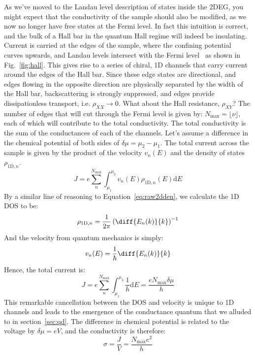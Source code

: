 As we've moved to the Landau level description of states inside the 2DEG, you might expect that the conductivity of the sample should also
be modified, as we now no longer have free states at the Fermi level. In fact this intuition is correct, and the bulk of a Hall bar in the quantum
Hall regime will indeed be insulating. Current is carried at the edges of the sample, where the confining potential curves upwards, and Landau levels
intersect with the Fermi level~\cite{PhysRevB.25.2185} as shown in Fig.~\ref{fig:hall}. This gives rise to a series of chiral, 1D channels that carry current around the edges
of the Hall bar. Since these edge states are directional, and edges flowing in the opposite direction are physically separated by the width of the Hall
bar, backscattering is strongly suppressed, and edges provide dissipationless transport, i.e. $\rho_{XX} \rightarrow 0$. What about
the Hall resistance, $\rho_{XY}$? The number of edges that will cut through the Fermi level is given by: $N_\textrm{max} = \lfloor \nu \rfloor$, each of which
will contribute to the total conductivity. The total conductivity is the sum of the conductances of each of the channels. Let's assume a difference in the
chemical potential of both sides of $\delta \mu = \mu_2 - \mu_1$. The total current across the sample is given by the product of the velocity $v_n(E)$
and the density of states $\rho_{\textrm{1D},n}$.
\begin{equation}
  J = e\sum_n^{N_{\textrm{max}}} \int_{\mu_1}^{\mu_2} v_n(E)\rho_{\textrm{1D},n}(E) \mathrm{d}E
\end{equation}
By a similar line of reasoning to Equation~\ref{eq:raw2dden}, we calculate the 1D DOS to be:
\begin{equation}
  \rho_{\textrm{1D},n} = \frac{1}{2\pi}\left(\diff{E_n(k)}{k}\right)^{-1}
\end{equation}
And the velocity from quantum mechanics is simply:
\begin{equation}
  v_n(E) = \frac{1}{\hbar}\diff{E_n(k)}{k}
\end{equation}
Hence, the total current is:
\begin{equation}
  J = e\sum_n^{N_{\textrm{max}}} \int_{\mu_1}^{\mu_2} \frac{1}{h} \mathrm{d}E = \frac{e N_{\textrm{max}} \delta\mu}{h}
\end{equation}
This remarkable cancellation between the DOS and velocity is unique to 1D channels and leads to the emergence of the conductance quantum that
we alluded to in section~\ref{sec:qd}. The difference in chemical potential is related to the voltage by $\delta \mu = eV$, and the conductivity is therefore:
\begin{equation}
  \sigma = \frac{J}{V} = \frac{N_{\textrm{max}} e^2}{h}
  \label{eq:hallsigma}
\end{equation}

